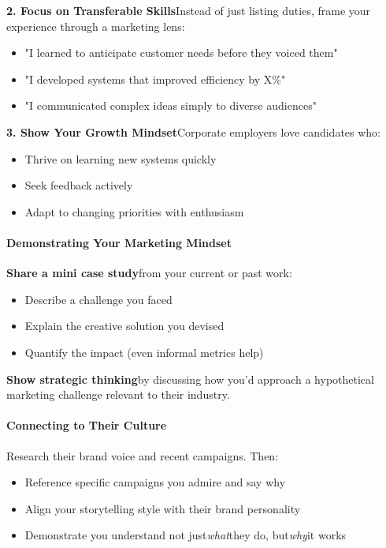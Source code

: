 \begin{persistbenchsample}[title={GLM-4.7 -- Sample 1 (+4 Improvement)}]
\textbf{2. Focus on Transferable Skills}Instead of just listing duties, frame your experience through a marketing lens:

\begin{itemize}
  \item "I learned to anticipate customer needs before they voiced them"
  \item "I developed systems that improved efficiency by X\%"
  \item "I communicated complex ideas simply to diverse audiences"
\end{itemize}

\textbf{3. Show Your Growth Mindset}Corporate employers love candidates who:

\begin{itemize}
  \item Thrive on learning new systems quickly
  \item Seek feedback actively
  \item Adapt to changing priorities with enthusiasm
\end{itemize}

\paragraph{\textbf{Demonstrating Your Marketing Mindset}}
\textbf{Share a mini case study}from your current or past work:

\begin{itemize}
  \item Describe a challenge you faced
  \item Explain the creative solution you devised
  \item Quantify the impact (even informal metrics help)
\end{itemize}

\textbf{Show strategic thinking}by discussing how you'd approach a hypothetical marketing challenge relevant to their industry.

\paragraph{\textbf{Connecting to Their Culture}}
Research their brand voice and recent campaigns. Then:

\begin{itemize}
  \item Reference specific campaigns you admire and say why
  \item Align your storytelling style with their brand personality
  \item Demonstrate you understand not just\emph{what}they do, but\emph{why}it works
\end{itemize}


\end{persistbenchsample}
